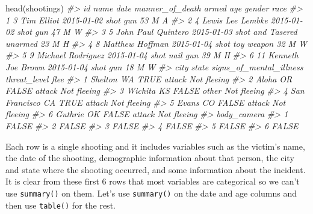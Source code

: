 \documentclass[
]{krantz}
\makeatletter
\newenvironment{Shaded}{\begin{snugshade}}{\end{snugshade}}
\newcommand{\CommentTok}[1]{\textcolor[rgb]{0.37,0.37,0.37}{\textit{#1}}}
\newcommand{\FunctionTok}[1]{\textcolor[rgb]{0,0,0}{#1}}
\newcommand{\NormalTok}[1]{#1}
\newenvironment{kframe}{%
\medskip{}
\setlength{\fboxsep}{.8em}
 \def\at@end@of@kframe{}%
 \ifinner\ifhmode%
  \def\at@end@of@kframe{\end{minipage}}%
  \begin{minipage}{\columnwidth}%
 \fi\fi%
 \def\FrameCommand##1{\hskip\@totalleftmargin \hskip-\fboxsep
 \colorbox{shadecolor}{##1}\hskip-\fboxsep
     \hskip-\linewidth \hskip-\@totalleftmargin \hskip\columnwidth}%
 \MakeFramed {\advance\hsize-\width
   \@totalleftmargin\z@ \linewidth\hsize
   \@setminipage}}%
 {\par\unskip\endMakeFramed%
 \at@end@of@kframe}
\renewenvironment{Shaded}{\begin{kframe}}{\end{kframe}}
\makeatother
\begin{document}
\begin{Shaded}
\begin{Highlighting}[]
\FunctionTok{head}\NormalTok{(shootings)}
\CommentTok{\#\textgreater{}   id               name       date  manner\_of\_death      armed age gender race}
\CommentTok{\#\textgreater{} 1  3         Tim Elliot 2015{-}01{-}02             shot        gun  53      M    A}
\CommentTok{\#\textgreater{} 2  4   Lewis Lee Lembke 2015{-}01{-}02             shot        gun  47      M    W}
\CommentTok{\#\textgreater{} 3  5 John Paul Quintero 2015{-}01{-}03 shot and Tasered    unarmed  23      M    H}
\CommentTok{\#\textgreater{} 4  8    Matthew Hoffman 2015{-}01{-}04             shot toy weapon  32      M    W}
\CommentTok{\#\textgreater{} 5  9  Michael Rodriguez 2015{-}01{-}04             shot   nail gun  39      M    H}
\CommentTok{\#\textgreater{} 6 11  Kenneth Joe Brown 2015{-}01{-}04             shot        gun  18      M    W}
\CommentTok{\#\textgreater{}            city state signs\_of\_mental\_illness threat\_level        flee}
\CommentTok{\#\textgreater{} 1       Shelton    WA                    TRUE       attack Not fleeing}
\CommentTok{\#\textgreater{} 2         Aloha    OR                   FALSE       attack Not fleeing}
\CommentTok{\#\textgreater{} 3       Wichita    KS                   FALSE        other Not fleeing}
\CommentTok{\#\textgreater{} 4 San Francisco    CA                    TRUE       attack Not fleeing}
\CommentTok{\#\textgreater{} 5         Evans    CO                   FALSE       attack Not fleeing}
\CommentTok{\#\textgreater{} 6       Guthrie    OK                   FALSE       attack Not fleeing}
\CommentTok{\#\textgreater{}   body\_camera}
\CommentTok{\#\textgreater{} 1       FALSE}
\CommentTok{\#\textgreater{} 2       FALSE}
\CommentTok{\#\textgreater{} 3       FALSE}
\CommentTok{\#\textgreater{} 4       FALSE}
\CommentTok{\#\textgreater{} 5       FALSE}
\CommentTok{\#\textgreater{} 6       FALSE}
\end{Highlighting}
\end{Shaded}

Each row is a single shooting and it includes variables such as the victim's name, the date of the shooting, demographic information about that person, the city and state where the shooting occurred, and some information about the incident. It is clear from these first 6 rows that most variables are categorical so we can't use \texttt{summary()} on them. Let's use \texttt{summary()} on the date and age columns and then use \texttt{table()} for the rest.
\end{document}
